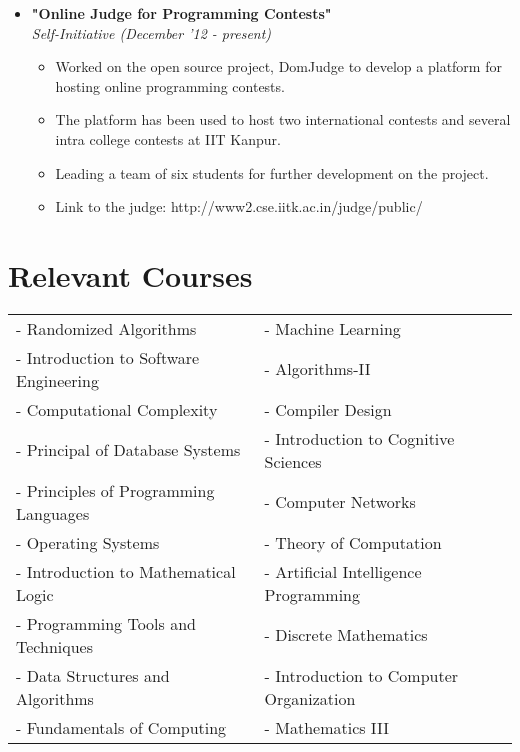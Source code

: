 \documentclass[margin,line]{resume}
\begin{document}
\begin{resume}
\begin{itemize}
  \item \large{\textbf{\textsf{"Online Judge for Programming Contests"}}}
    \\ \small{\textit{Self-Initiative (December '12 - present)}}
    \normalsize
    \begin{itemize}
    \item Worked on the open source project, DomJudge to develop a platform for hosting online programming contests.
    \item The platform has been used to host two international contests and several intra college contests at IIT Kanpur.
    \item Leading a team of six students for further development on the project.
    \item Link to the judge: http://www2.cse.iitk.ac.in/judge/public/
    \end{itemize}
    
  \end{itemize}




  \section{\mysidestyle Relevant Courses}

  \begin{tabular}{@{}p{6cm}p{6.5cm}}
    - Randomized Algorithms & - Machine Learning \\
    - Introduction to Software Engineering & - Algorithms-II \\
    - Computational Complexity &- Compiler Design \\
    - Principal of Database Systems &- Introduction to Cognitive Sciences \\
    - Principles of Programming Languages &- Computer Networks \\
    - Operating Systems &- Theory of Computation \\
    - Introduction to Mathematical Logic &- Artificial Intelligence Programming \\
    - Programming Tools and Techniques &- Discrete Mathematics \\
    - Data Structures and Algorithms & - Introduction to Computer Organization \\
    - Fundamentals of Computing &- Mathematics III
  \end{tabular}



\end{resume}
\end{document}
